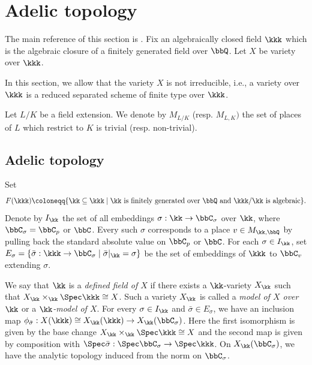\section{Adelic topology}

    The main reference of this section is \cite{Xie25ZDOsurfaces}.
    Fix an algebraically closed field \(\kkk\) which is the algebraic closure of a finitely generated field over \(\bbQ\).
    Let \(X\) be variety over \(\kkk\).

    In this section, we allow that the variety \(X\) is not irreducible, 
    i.e., a variety over \(\kkk\) is a reduced separated scheme of finite type over \(\kkk\).

    Let \(L/K\) be a field extension.
    We denote by \(M_{L/K}\) (resp. \(M_{L,K})\) the set of places of \(L\) which restrict to \(K\) is trivial (resp. non-trivial).


\subsection{Adelic topology}

    \begin{notation}\label{notation:embedding_set_for_adelic_topology}
        Set 
        \[ F(\kkk) \coloneqq \{\kk \subseteq \kkk \mid \kk \text{ is finitely generated over } \bbQ \text{ and } \kkk/\kk \text{ is algebraic}\}. \]
        Denote by \(I_\kk\) the set of all embeddings \(\sigma: \kk \to \bbC_\sigma\) over \(\kk\), where \(\bbC_\sigma = \bbC_p\) or \(\bbC\).
        Every such \(\sigma\) corresponds to a place \(v\in M_{\kk,\bbQ}\) by pulling back the standard absolute value on \(\bbC_p\) or \(\bbC\).
        For each \(\sigma\in I_\kk\), set \(E_\sigma = \{\bar{\sigma}: \kkk \to \bbC_\sigma \mid \bar{\sigma}|_\kk = \sigma\}\) be the set of embeddings of \(\kkk\) to \(\bbC_v\) extending \(\sigma\).
        
        We say that \(\kk\) is a \emph{defined field of \(X\)} if there exists a \(\kk\)-variety \(X_\kk\) such that \(X_\kk \times_{\kk} \Spec \kkk \cong X\).
        Such a variety \(X_\kk\) is called a \emph{model of \(X\) over \(\kk\)} or a \emph{\(\kk\)-model of \(X\)}.
        For every \(\sigma \in I_\kk\) and \(\bar{\sigma} \in E_\sigma\), we have an inclusion map \(\phi_{\bar{\sigma}}: X(\kkk) \cong X_{\kk}(\kkk) \to X_{\kk}(\bbC_{\sigma})\).
        Here the first isomorphism is given by the base change \(X_\kk \times_{\kk} \Spec \kkk \cong X\) and the second map is given by composition with \(\Spec \bar{\sigma}: \Spec \bbC_\sigma \to \Spec \kkk\).
        On \(X_{\kk}(\bbC_\sigma)\), we have the analytic topology induced from the norm on \(\bbC_\sigma\).
    \end{notation}

